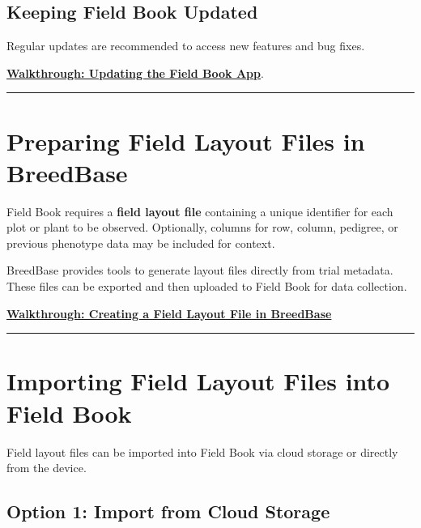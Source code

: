 \documentclass[
  12pt,
]{book}
\begin{document}
\hypertarget{keeping-field-book-updated}{%
\subsection{Keeping Field Book Updated}\label{keeping-field-book-updated}}

Regular updates are recommended to access new features and bug fixes.

\href{https://scribehow.com/shared/Updating_the_Field_Book_App__qdTEMk1lSkadYj8zXgOYgA}{\textbf{Walkthrough: Updating the Field Book App}}.

\begin{center}\rule{0.5\linewidth}{0.5pt}\end{center}

\hypertarget{preparing-field-layout-files-in-breedbase}{%
\section{Preparing Field Layout Files in BreedBase}\label{preparing-field-layout-files-in-breedbase}}

Field Book requires a \textbf{field layout file} containing a unique identifier for each plot or plant to be observed. Optionally, columns for row, column, pedigree, or previous phenotype data may be included for context.

BreedBase provides tools to generate layout files directly from trial metadata. These files can be exported and then uploaded to Field Book for data collection.

\href{https://scribehow.com/shared/Creating_a_Field_Layout_File_for_Field_Book_in_Breedbase__FDBwW83OS66kHXIvVsP-1A?referrer=documents}{\textbf{Walkthrough: Creating a Field Layout File in BreedBase}}

\begin{center}\rule{0.5\linewidth}{0.5pt}\end{center}

\hypertarget{importing-field-layout-files-into-field-book}{%
\section{Importing Field Layout Files into Field Book}\label{importing-field-layout-files-into-field-book}}

Field layout files can be imported into Field Book via cloud storage or directly from the device.

\hypertarget{option-1-import-from-cloud-storage}{%
\subsection{Option 1: Import from Cloud Storage}\label{option-1-import-from-cloud-storage}}
\end{document}
